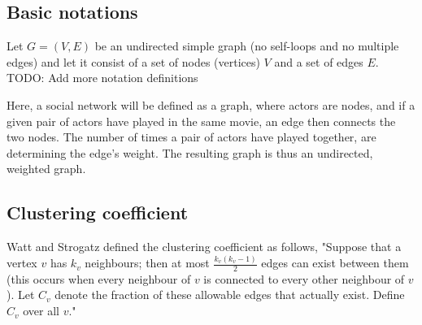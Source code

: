 \documentclass{article}
\begin{document}
\subsection{Basic notations}
Let $G = (V,E)$ be an undirected simple graph (no self-loops and no multiple edges) and let it consist of a set of nodes (vertices) $V$ and a set of edges $E$. TODO: Add more notation definitions

Here, a social network will be defined as a graph, where actors are nodes, and if a given pair of actors have played in the same movie, an edge then connects the two nodes. The number of times a pair of actors have played together, are determining the edge's weight. The resulting graph is thus an undirected, weighted graph.




\subsection{Clustering coefficient}

Watt and Strogatz defined the clustering coefficient as follows, "Suppose that a vertex $v$ has $k_{v}$ neighbours; then at most $\frac{k_{v}(k_{v}-1)}{2}$ edges can exist between them (this occurs when every neighbour of $v$ is connected to every other neighbour of $v$). Let $C_{v}$ denote the fraction of these allowable edges that actually exist. Define $C_{v}$ over all $v$." 

\end{document}
